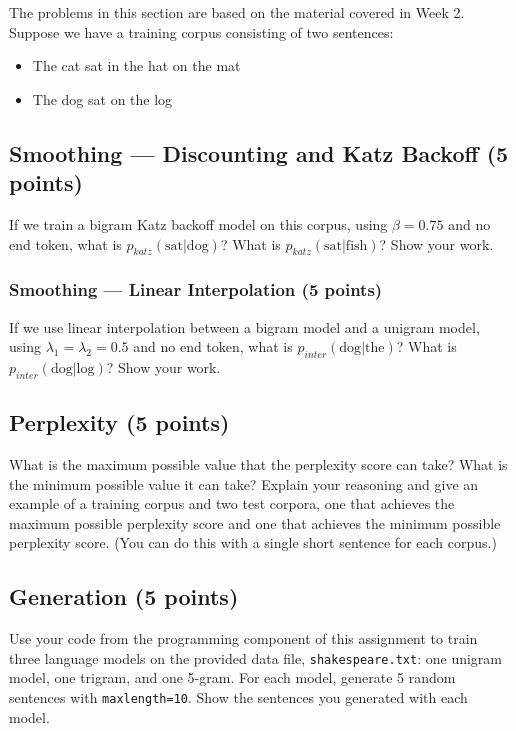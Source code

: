\documentclass[12pt,a4paper]{article}
\begin{document}
The problems in this section are based on the material covered in Week 2. \\

Suppose we have a training corpus consisting of two sentences:
\begin{itemize}
\item The cat sat in the hat on the mat
\item The dog sat on the log
\end{itemize}

\subsection{Smoothing --- Discounting and Katz Backoff (5 points)}

If we train a bigram Katz backoff model on this corpus, using $\beta = 0.75$ and no end token, what is $p_{katz}(\text{sat}|\text{dog})$? What is $p_{katz}(\text{sat}|\text{fish})$? Show your work.

\subsubsection{Smoothing --- Linear Interpolation (5 points)}

If we use linear interpolation between a bigram model and a unigram model, using $\lambda_1 = \lambda_2 = 0.5$ and no end token, what is $p_{inter}(\text{dog}|\text{the})$? What is $p_{inter}(\text{dog}|\text{log})$? Show your work.

\subsection{Perplexity (5 points)} 

What is the maximum possible value that the perplexity score can take? What is the minimum possible value it can take? Explain your reasoning and give an example of a training corpus and two test corpora, one that achieves the maximum possible perplexity score and one that achieves the minimum possible perplexity score. (You can do this with a single short sentence for each corpus.)

\subsection{Generation (5 points)}

Use your code from the programming component of this assignment to train three language models on the provided data file, {\tt shakespeare.txt}: one unigram model, one trigram, and one 5-gram. For each model, generate 5 random sentences with {\tt max\textunderscore length=10}. Show the sentences you generated with each model.
\end{document}
